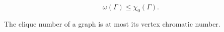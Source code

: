 $$\omega(\Gamma) \leq \chi_0(\Gamma).$$

The clique number of a graph is at most its vertex chromatic number.
